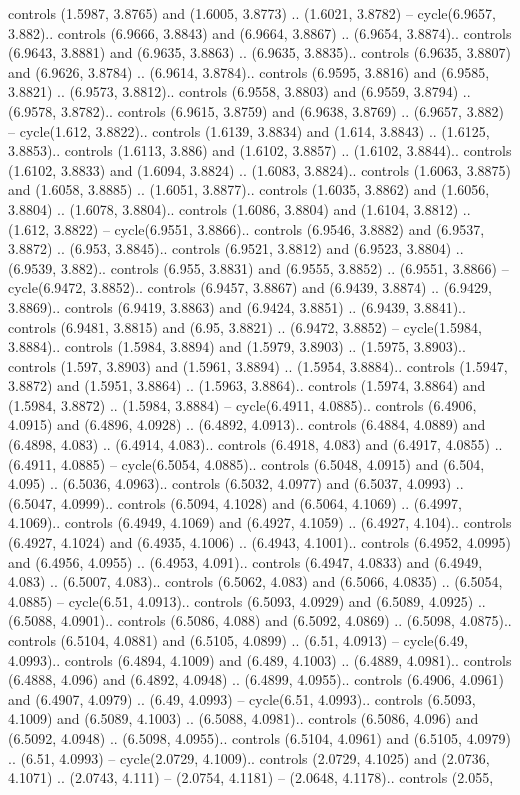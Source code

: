 controls (1.5987, 3.8765) and (1.6005, 3.8773) .. (1.6021, 3.8782) -- cycle(6.9657, 3.882).. controls (6.9666, 3.8843) and (6.9664, 3.8867) .. (6.9654, 3.8874).. controls (6.9643, 3.8881) and (6.9635, 3.8863) .. (6.9635, 3.8835).. controls (6.9635, 3.8807) and (6.9626, 3.8784) .. (6.9614, 3.8784).. controls (6.9595, 3.8816) and (6.9585, 3.8821) .. (6.9573, 3.8812).. controls (6.9558, 3.8803) and (6.9559, 3.8794) .. (6.9578, 3.8782).. controls (6.9615, 3.8759) and (6.9638, 3.8769) .. (6.9657, 3.882) -- cycle(1.612, 3.8822).. controls (1.6139, 3.8834) and (1.614, 3.8843) .. (1.6125, 3.8853).. controls (1.6113, 3.886) and (1.6102, 3.8857) .. (1.6102, 3.8844).. controls (1.6102, 3.8833) and (1.6094, 3.8824) .. (1.6083, 3.8824).. controls (1.6063, 3.8875) and (1.6058, 3.8885) .. (1.6051, 3.8877).. controls (1.6035, 3.8862) and (1.6056, 3.8804) .. (1.6078, 3.8804).. controls (1.6086, 3.8804) and (1.6104, 3.8812) .. (1.612, 3.8822) -- cycle(6.9551, 3.8866).. controls (6.9546, 3.8882) and (6.9537, 3.8872) .. (6.953, 3.8845).. controls (6.9521, 3.8812) and (6.9523, 3.8804) .. (6.9539, 3.882).. controls (6.955, 3.8831) and (6.9555, 3.8852) .. (6.9551, 3.8866) -- cycle(6.9472, 3.8852).. controls (6.9457, 3.8867) and (6.9439, 3.8874) .. (6.9429, 3.8869).. controls (6.9419, 3.8863) and (6.9424, 3.8851) .. (6.9439, 3.8841).. controls (6.9481, 3.8815) and (6.95, 3.8821) .. (6.9472, 3.8852) -- cycle(1.5984, 3.8884).. controls (1.5984, 3.8894) and (1.5979, 3.8903) .. (1.5975, 3.8903).. controls (1.597, 3.8903) and (1.5961, 3.8894) .. (1.5954, 3.8884).. controls (1.5947, 3.8872) and (1.5951, 3.8864) .. (1.5963, 3.8864).. controls (1.5974, 3.8864) and (1.5984, 3.8872) .. (1.5984, 3.8884) -- cycle(6.4911, 4.0885).. controls (6.4906, 4.0915) and (6.4896, 4.0928) .. (6.4892, 4.0913).. controls (6.4884, 4.0889) and (6.4898, 4.083) .. (6.4914, 4.083).. controls (6.4918, 4.083) and (6.4917, 4.0855) .. (6.4911, 4.0885) -- cycle(6.5054, 4.0885).. controls (6.5048, 4.0915) and (6.504, 4.095) .. (6.5036, 4.0963).. controls (6.5032, 4.0977) and (6.5037, 4.0993) .. (6.5047, 4.0999).. controls (6.5094, 4.1028) and (6.5064, 4.1069) .. (6.4997, 4.1069).. controls (6.4949, 4.1069) and (6.4927, 4.1059) .. (6.4927, 4.104).. controls (6.4927, 4.1024) and (6.4935, 4.1006) .. (6.4943, 4.1001).. controls (6.4952, 4.0995) and (6.4956, 4.0955) .. (6.4953, 4.091).. controls (6.4947, 4.0833) and (6.4949, 4.083) .. (6.5007, 4.083).. controls (6.5062, 4.083) and (6.5066, 4.0835) .. (6.5054, 4.0885) -- cycle(6.51, 4.0913).. controls (6.5093, 4.0929) and (6.5089, 4.0925) .. (6.5088, 4.0901).. controls (6.5086, 4.088) and (6.5092, 4.0869) .. (6.5098, 4.0875).. controls (6.5104, 4.0881) and (6.5105, 4.0899) .. (6.51, 4.0913) -- cycle(6.49, 4.0993).. controls (6.4894, 4.1009) and (6.489, 4.1003) .. (6.4889, 4.0981).. controls (6.4888, 4.096) and (6.4892, 4.0948) .. (6.4899, 4.0955).. controls (6.4906, 4.0961) and (6.4907, 4.0979) .. (6.49, 4.0993) -- cycle(6.51, 4.0993).. controls (6.5093, 4.1009) and (6.5089, 4.1003) .. (6.5088, 4.0981).. controls (6.5086, 4.096) and (6.5092, 4.0948) .. (6.5098, 4.0955).. controls (6.5104, 4.0961) and (6.5105, 4.0979) .. (6.51, 4.0993) -- cycle(2.0729, 4.1009).. controls (2.0729, 4.1025) and (2.0736, 4.1071) .. (2.0743, 4.111) -- (2.0754, 4.1181) -- (2.0648, 4.1178).. controls (2.055, 